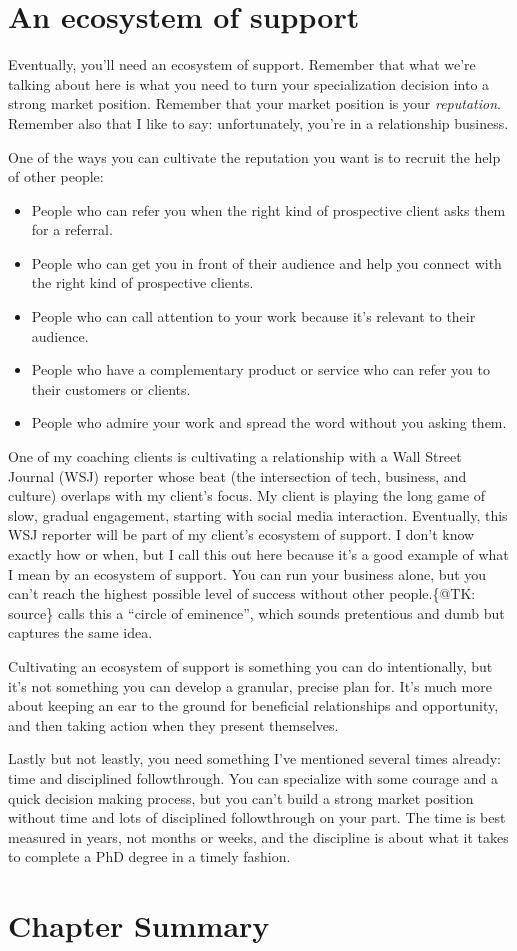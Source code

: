\section{An ecosystem of support}

Eventually, you'll need an ecosystem of support. Remember that what we're talking about here is what you need to turn your specialization decision into a strong market position. Remember that your market position is your \emph{reputation}. Remember also that I like to say: unfortunately, you're in a relationship business.

One of the ways you can cultivate the reputation you want is to recruit the help of other people:

\begin{itemize}
\item People who can refer you when the right kind of prospective client asks them for a referral.
\item People who can get you in front of their audience and help you connect with the right kind of prospective clients.
\item People who can call attention to your work because it's relevant to their audience.
\item People who have a complementary product or service who can refer you to their customers or clients.
\item People who admire your work and spread the word without you asking them.
\end{itemize}

One of my coaching clients is cultivating a relationship with a Wall Street Journal (WSJ) reporter whose beat (the intersection of tech, business, and culture) overlaps with my client's focus. My client is playing the long game of slow, gradual engagement, starting with social media interaction. Eventually, this WSJ reporter will be part of my client's ecosystem of support. I don't know exactly how or when, but I call this out here because it's a good example of what I mean by an ecosystem of support. You can run your business alone, but you can't reach the highest possible level of success without other people.\{@TK: source\} calls this a “circle of eminence”, which sounds pretentious and dumb but captures the same idea.

Cultivating an ecosystem of support is something you can do intentionally, but it's not something you can develop a granular, precise plan for. It's much more about keeping an ear to the ground for beneficial relationships and opportunity, and then taking action when they present themselves.

Lastly but not leastly, you need something I've mentioned several times already: time and disciplined followthrough. You can specialize with some courage and a quick decision making process, but you can't build a strong market position without time and lots of disciplined followthrough on your part. The time is best measured in years, not months or weeks, and the discipline is about what it takes to complete a PhD degree in a timely fashion.

\section{Chapter Summary}